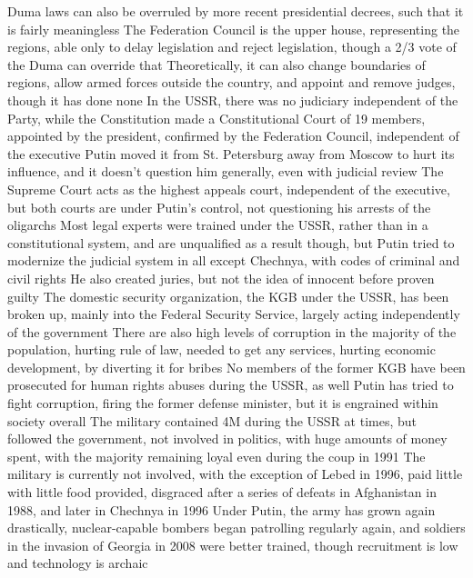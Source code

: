 \documentclass[11 pt, twoside]{article}
\newenvironment{outline*}
{
	\begin{outline}[enumerate]
	}
	{\end{outline}
}
\begin{document}
\begin{outline*}
\3 Duma laws can also be overruled by more recent presidential decrees, such that it is fairly meaningless
\2 The Federation Council is the upper house, representing the regions, able only to delay legislation and reject legislation, though a 2/3 vote of the Duma can override that
\3 Theoretically, it can also change boundaries of regions, allow armed forces outside the country, and appoint and remove judges, though it has done none
\1 In the USSR, there was no judiciary independent of the Party, while the Constitution made a Constitutional Court of 19 members, appointed by the president, confirmed by the Federation Council, independent of the executive
\2 Putin moved it from St. Petersburg away from Moscow to hurt its influence, and it doesn't question him generally, even with judicial review
\1 The Supreme Court acts as the highest appeals court, independent of the executive, but both courts are under Putin's control, not questioning his arrests of the oligarchs
\2 Most legal experts were trained under the USSR, rather than in a constitutional system, and are unqualified as a result though, but Putin tried to modernize the judicial system in all except Chechnya, with codes of criminal and civil rights
\2 He also created juries, but not the idea of innocent before proven guilty
\1 The domestic security organization, the KGB under the USSR, has been broken up, mainly into the Federal Security Service, largely acting independently of the government
\2 There are also high levels of corruption in the majority of the population, hurting rule of law, needed to get any services, hurting economic development, by diverting it for bribes
\2 No members of the former KGB have been prosecuted for human rights abuses during the USSR, as well
\2 Putin has tried to fight corruption, firing the former defense minister, but it is engrained within society overall
\1 The military contained 4M during the USSR at times, but followed the government, not involved in politics, with huge amounts of money spent, with the majority remaining loyal even during the coup in 1991
\2 The military is currently not involved, with the exception of Lebed in 1996, paid little with little food provided, disgraced after a series of defeats in Afghanistan in 1988, and later in Chechnya in 1996
\2 Under Putin, the army has grown again drastically, nuclear-capable bombers began patrolling regularly again, and soldiers in the invasion of Georgia in 2008 were better trained, though recruitment is low and technology is archaic
\end{outline*}
\end{document}
